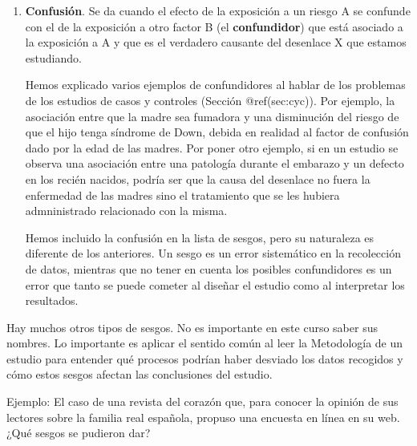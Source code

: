 \documentclass[
  spanish,
  letterpaper,
  DIV=11,
  numbers=noendperiod]{scrreprt}
\begin{document}
\begin{enumerate}
\begin{enumerate}
    El ``efecto Hawthorne'' refiere al nombre de una fábrica en el que
    se realizó un estudio sobre qué condiciones aumentaban la
    productividad, y todos los grupos aumentaron su productividad
    durante el seguimiento. Este aumento se debió al efecto
    ``motivador'' de ser observados, porque cuando terminó el estudio
    volvieron todos a su productividad normal.
  \item
    \textbf{Sesgo de error instrumental}: Cuando los instrumentos usados
    para medir alguna característica son defectuosos. Sería el caso, por
    ejemplo, del esfigmomanómetro del primer párrafo de esta sección.
  \end{enumerate}
\item
  \textbf{Confusión}. Se da cuando el efecto de la exposición a un
  riesgo A se confunde con el de la exposición a otro factor B (el
  \textbf{confundidor}) que está asociado a la exposición a A y que es
  el verdadero causante del desenlace X que estamos estudiando.

  Hemos explicado varios ejemplos de confundidores al hablar de los
  problemas de los estudios de casos y controles (Sección
  @ref(sec:cyc)). Por ejemplo, la asociación entre que la madre sea
  fumadora y una disminución del riesgo de que el hijo tenga síndrome de
  Down, debida en realidad al factor de confusión dado por la edad de
  las madres. Por poner otro ejemplo, si en un estudio se observa una
  asociación entre una patología durante el embarazo y un defecto en los
  recién nacidos, podría ser que la causa del desenlace no fuera la
  enfermedad de las madres sino el tratamiento que se les hubiera
  admninistrado relacionado con la misma.

  Hemos incluido la confusión en la lista de sesgos, pero su naturaleza
  es diferente de los anteriores. Un sesgo es un error sistemático en la
  recolección de datos, mientras que no tener en cuenta los posibles
  confundidores es un error que tanto se puede cometer al diseñar el
  estudio como al interpretar los resultados.
\end{enumerate}

Hay muchos otros tipos de sesgos. No es importante en este curso saber
sus nombres. Lo importante es aplicar el sentido común al leer la
Metodología de un estudio para entender qué procesos podrían haber
desviado los datos recogidos y cómo estos sesgos afectan las
conclusiones del estudio.

Ejemplo: El caso de una revista del corazón que, para conocer la opinión
de sus lectores sobre la familia real española, propuso una encuesta en
línea en su web. ¿Qué sesgos se pudieron dar?
\end{document}
